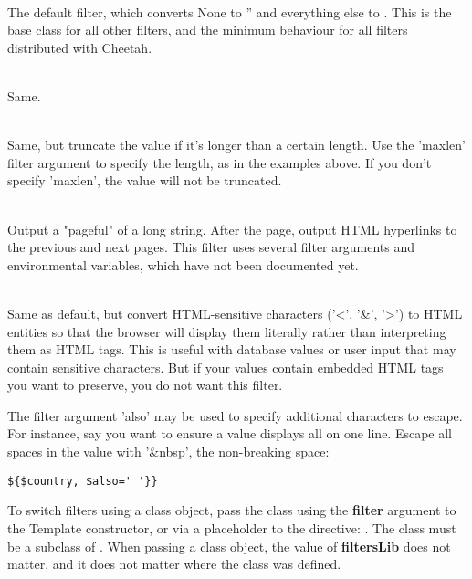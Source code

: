 \begin{description}
\item{}
     \\ The default filter, which converts None to '' and everything else to
     .  This is the base class for all other filters,
     and the minimum behaviour for all filters distributed with Cheetah.
\item{}
     \\ Same.
\item{}
     \\ Same, but truncate the value if it's longer than a certain length.
     Use the 'maxlen' filter argument to specify the length, as in the
     examples above.  If you don't specify 'maxlen', the value will not be
     truncated.
\item{}
     \\ Output a "pageful" of a long string.  After the page, output HTML
     hyperlinks to the previous and next pages.  This filter uses several
     filter arguments and environmental variables, which have not been 
     documented yet.
\item{}
     \\ Same as default, but convert HTML-sensitive characters ('<', '\&', '>')
     to HTML entities so that the browser will display them literally rather
     than interpreting them as HTML tags.  This is useful with database values
     or user input that may contain sensitive characters.  But if your values
     contain embedded HTML tags you want to preserve, you do not want this 
     filter.
     
     The filter argument 'also' may be used to specify additional characters to
     escape.  For instance, say you want to ensure a value displays all on one
     line.  Escape all spaces in the value with '\&nbsp', the non-breaking
     space:
\begin{verbatim}
${$country, $also=' '}}
\end{verbatim}
\end{description}

To switch filters using a class object, pass the class using the
{\bf filter} argument to the Template constructor, or via a placeholder to the
 directive: .  The class must be
a subclass of .  When passing a class object, the
value of {\bf filtersLib} does not matter, and it does not matter where the
class was defined.

